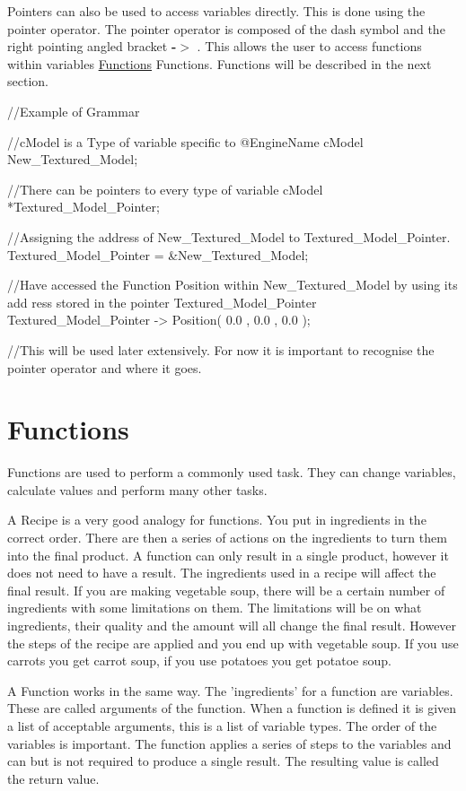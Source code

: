 Pointers can also be used to access variables directly. This is done using the pointer operator. The pointer operator is composed of the dash symbol and the right pointing angled bracket {\bfseries -\/$>$} . This allows the user to access functions within variables \hyperlink{_programming_basics_BasicsPageFunctions}{Functions} Functions. Functions will be described in the next section. 
\begin{DoxyCode}
 //Example of Grammar

 //cModel is a Type of variable specific to @EngineName
 cModel New_Textured_Model;

 //There can be pointers to every type of variable
 cModel *Textured_Model_Pointer;

 //Assigning the address of New_Textured_Model to Textured_Model_Pointer.
 Textured_Model_Pointer = &New_Textured_Model;

 //Have accessed the Function Position within New_Textured_Model by using its add
      ress stored in the pointer Textured_Model_Pointer
 Textured_Model_Pointer -> Position( 0.0 , 0.0 , 0.0 );

 //This will be used later extensively. For now it is important to recognise the 
      pointer operator and where it goes.
\end{DoxyCode}
 \hypertarget{_programming_basics_BasicsPageFunctions}{}\section{Functions}\label{_programming_basics_BasicsPageFunctions}
Functions are used to perform a commonly used task. They can change variables, calculate values and perform many other tasks. \par
 A Recipe is a very good analogy for functions. You put in ingredients in the correct order. There are then a series of actions on the ingredients to turn them into the final product. A function can only result in a single product, however it does not need to have a result. The ingredients used in a recipe will affect the final result. If you are making vegetable soup, there will be a certain number of ingredients with some limitations on them. The limitations will be on what ingredients, their quality and the amount will all change the final result. However the steps of the recipe are applied and you end up with vegetable soup. If you use carrots you get carrot soup, if you use potatoes you get potatoe soup. \par
 A Function works in the same way. The 'ingredients' for a function are variables. These are called arguments of the function. When a function is defined it is given a list of acceptable arguments, this is a list of variable types. The order of the variables is important. The function applies a series of steps to the variables and can but is not required to produce a single result. The resulting value is called the return value.\par
